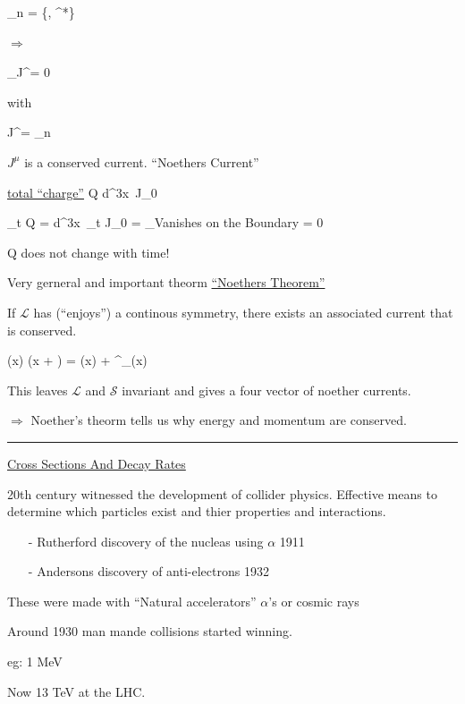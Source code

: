 {\be
\phi_n = \{\phi, \phi^*\}
\ee

$\Rightarrow$

\be
\partial_\mu J^\mu = 0
\ee

with 

\be
J^\mu = \sum_n 
\ee

$J^\mu$ is a conserved current.  ``Noethers Current''


\underline{total ``charge''}
\be
Q \equiv \int d^3x\ J_0 
\ee


\be
\partial_t Q = \int d^3x\ \partial_t J_0 = _{\textrm{Vanishes on the Boundary}} = 0
\ee
 
Q does not change with time! 

Very gerneral and important theorm \underline{``Noethers Theorem''}

If $\mathcal{L}$ has (``enjoys'') a continous symmetry, there exists an associated current that is conserved. 

\be
\phi(x) \rightarrow \phi(x + \epsilon) = \phi(x) + \epsilon^\mu \partial_\mu \phi(x)
\ee

This leaves $\mathcal{L}$ and $\mathcal{S}$ invariant and gives a four vector of noether currents. 

$\Rightarrow$ Noether's theorm tells us why energy and momentum are conserved. 


\noindent\rule{\textwidth}{1pt}

\clearpage

\underline{\Large Cross Sections And Decay Rates}

20th century witnessed the development of collider physics. 
Effective means to determine which particles exist and thier properties and interactions.

\begin{itemize}
\item[-] Rutherford discovery of the nucleas using $\alpha$ 1911 
\item[-] Andersons discovery of anti-electrons 1932
\end{itemize}

These were made with ``Natural accelerators'' $\alpha$'s or cosmic rays

Around 1930 man mande collisions started winning. 

eg: 1 MeV 

Now 13 TeV at the LHC.

}

